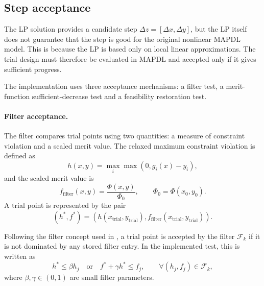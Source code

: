 \documentclass[11pt,a4paper]{article}
\begin{document}
\subsection{Step acceptance}
\label{sec:slpA:accept}

The LP solution provides a candidate step
$\Delta z=[\Delta x,\Delta y]$, but the LP itself does not guarantee
that the step is good for the original nonlinear MAPDL model. This is
because the LP is based only on local linear approximations. The
trial design must therefore be evaluated in MAPDL and accepted only
if it gives sufficient progress.

The implementation uses three acceptance mechanisms: a filter test,
a merit-function sufficient-decrease test and a feasibility
restoration test.

\paragraph{Filter acceptance.}

The filter compares trial points using two quantities: a measure of
constraint violation and a scaled merit value. The relaxed maximum
constraint violation is defined as
\begin{equation}
\label{eq:appA_filter_h}
    h(x,y)
    =
    \max_i
    \max\left(0, g_i(x)-y_i\right),
\end{equation}
and the scaled merit value is
\begin{equation}
\label{eq:appA_filter_f}
    f_{\mathrm{filter}}(x,y)
    =
    \frac{\Phi(x,y)}{\Phi_0},
    \qquad
    \Phi_0=\Phi(x_0,y_0).
\end{equation}
A trial point is represented by the pair
\begin{equation}
\label{eq:appA_filter_pair}
    \left(h^*, f^*\right)
    =
    \left(
        h(x_{\mathrm{trial}},y_{\mathrm{trial}}),
        f_{\mathrm{filter}}(x_{\mathrm{trial}},y_{\mathrm{trial}})
    \right).
\end{equation}

Following the filter concept used in \cite{sorensen2015thicknessfilters},
a trial point is accepted by the filter $\mathcal{F}_k$ if it is not
dominated by any stored filter entry. In the implemented test, this
is written as
\begin{equation}
\label{eq:appA_filter_accept}
    h^* \leq \beta h_j
    \quad \text{or} \quad
    f^* + \gamma h^* \leq f_j,
    \qquad
    \forall (h_j,f_j)\in\mathcal{F}_k ,
\end{equation}
where $\beta,\gamma\in(0,1)$ are small filter parameters.
\end{document}
